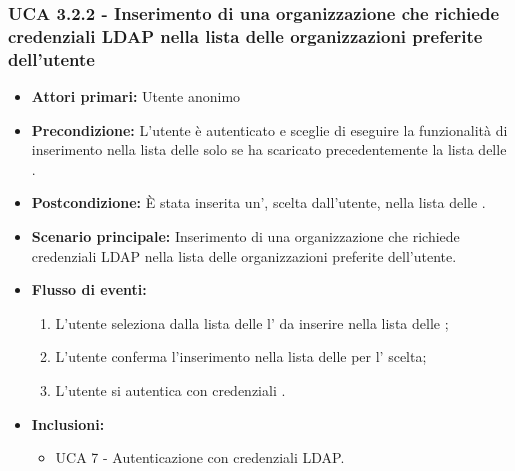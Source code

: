 \subsubsection{UCA 3.2.2 - Inserimento di una organizzazione che richiede credenziali LDAP nella lista delle organizzazioni preferite dell'utente}%
\begin{itemize}
	\item \textbf{Attori primari:} Utente anonimo
	\item \textbf{Precondizione:} L'utente è autenticato e sceglie di eseguire la funzionalità di inserimento nella lista delle  solo se ha scaricato precedentemente la lista delle .
	\item \textbf{Postcondizione:} È stata inserita un', scelta dall'utente, nella lista delle .
	\item \textbf{Scenario principale:} Inserimento di una organizzazione che richiede credenziali LDAP nella lista delle organizzazioni preferite dell'utente.
	\item \textbf{Flusso di eventi:}
	\begin{enumerate}
		\item L'utente seleziona dalla lista delle  l' da inserire nella lista delle ;
		\item L'utente conferma l'inserimento nella lista delle  per l' scelta;
		\item L'utente si autentica con credenziali .
	\end{enumerate}
	\item \textbf{Inclusioni:}
	\begin{itemize}
			\item UCA 7 - Autenticazione con credenziali LDAP.
	\end{itemize}
\end{itemize}

